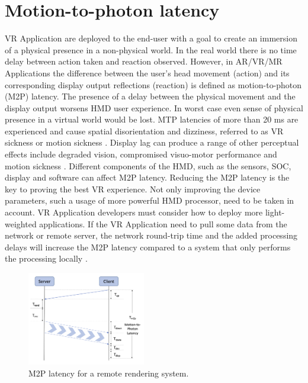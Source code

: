 \section{Motion-to-photon latency}
\label{sec:theorie:m2p}
VR Application are deployed to the end-user with a goal to create an immersion of a physical presence in a non-physical world. In the real world there is no time delay between action taken and reaction observed. However, in AR/VR/MR Applications the difference between the user's head movement (action) and its corresponding display output reflections (reaction) is defined as motion-to-photon (M2P) latency. The presence of a delay between the physical movement and the display output worsens HMD user experience. In worst case even sense of physical presence in a virtual world would be lost. MTP latencies of more than 20 ms are experienced and cause spatial disorientation and dizziness, referred to as VR sickness or motion sickness \cite{delay_sickness, serhan_kalman}. Display lag can produce a range of other perceptual effects include degraded vision, compromised visuo-motor performance and motion sickness \cite{delay_sickness}. Different components of the HMD, such as the sensors, SOC, display and software can affect M2P latency. Reducing the M2P latency is the key to proving the best VR experience. Not only improving the device parameters, such a usage of more powerful HMD processor, need to be taken in account. VR Application developers must consider how to deploy more light-weighted applications. If the VR Application need to pull some data from the network or remote server, the network round-trip time and the added processing delays will increase the M2P latency compared to a system that only performs the processing locally \cite{serhan_kalman}.\\

\begin{figure}
	\centering
	\includegraphics[width=0.46\textwidth]{gfx/m2p.png}
	\caption{\label{fig:m2p}M2P latency for a remote rendering system.}
\end{figure}

